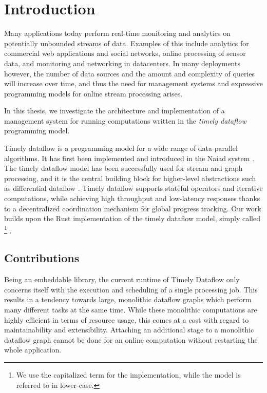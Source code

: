 \chapter{Introduction}\label{ch:introduction}

Many applications today perform real-time monitoring and analytics on
potentially unbounded streams of data. Examples of this include analytics for
commercial web applications and social networks, online processing of sensor
data, and monitoring and networking in datacenters. In many deployments however,
the number of data sources and the amount and complexity of queries will increase
over time, and thus the need for management systems and expressive programming
models for online stream processing arises.

\vspace{0.66em}
In this thesis, we investigate the architecture and implementation of a
management system for running computations written in the \emph{timely
dataflow} programming model.
\vspace{0.66em}

Timely dataflow is a programming model for a wide range of data-parallel algorithms.
It has first been implemented and introduced in the Naiad system \cite{naiad}.
The timely dataflow model has been successfully used for stream and graph
processing, and it is the central building block for
higher-level abstractions such as differential dataflow \cite{differential}.
Timely dataflow supports stateful operators and iterative computations, while
achieving high throughput and low-latency responses thanks to a decentralized
coordination mechanism for global progress tracking. Our work
builds upon the Rust implementation of the timely dataflow model,
simply called \footnote{We use the capitalized term
for the implementation, while the model is referred to in lower-case.} \cite{timely}.

\section{Contributions}

Being an embeddable library, the current runtime of Timely Dataflow only
concerns itself with the execution and scheduling of a single processing job.
This results in a tendency towards large, monolithic dataflow graphs which
perform many different tasks at the same time. While these monolithic computations
are highly efficient in terms of resource usage, this comes at a cost with regard
to maintainability and extensibility. Attaching an additional stage to a monolithic
dataflow graph cannot be done for an online computation without restarting the
whole application.

